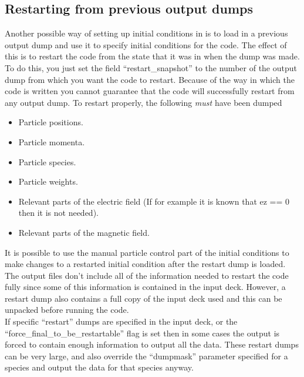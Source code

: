 \subsection{\texorpdfstring
  {Restarting {\EPOCH} from previous output dumps}
  {Restarting {EPOCH} from previous output dumps}}
Another possible way of setting up initial conditions in {\EPOCH} is to load in
a previous output dump and use it to specify initial conditions for the
code. The effect of this is to restart the code from the state that it was in
when the dump was made. To do this, you just
set the field ``restart\_snapshot'' to
the number of the output dump from which you want the code to restart. Because
of the way in which the code is written you cannot guarantee that the code will
successfully restart from any output dump. To restart properly, the
following {\it must} have been dumped
\begin{itemize}
\item Particle positions.
\item Particle momenta.
\item Particle species.
\item Particle weights.
\item Relevant parts of the electric field (If for example it is known that
  ez == 0 then it is not needed).
\item Relevant parts of the magnetic field.
\end{itemize}
It is possible to use the manual particle control part of the
initial conditions to make changes to a restarted initial condition after the
restart dump is loaded. The output files don't include all of the information
needed to restart the code fully since some of this information is contained
in the input deck. However, a restart dump also contains a full copy
of the input deck used and this can be unpacked before running the
code.\\

If specific ``restart'' dumps are specified in the input deck, or the
``force\_final\_to\_be\_restartable'' flag is set then in some cases the
output is forced to contain enough information to output all the data. These
restart dumps can be very large, and also override the ``dumpmask'' parameter
specified for a species and output the data for that species anyway.

